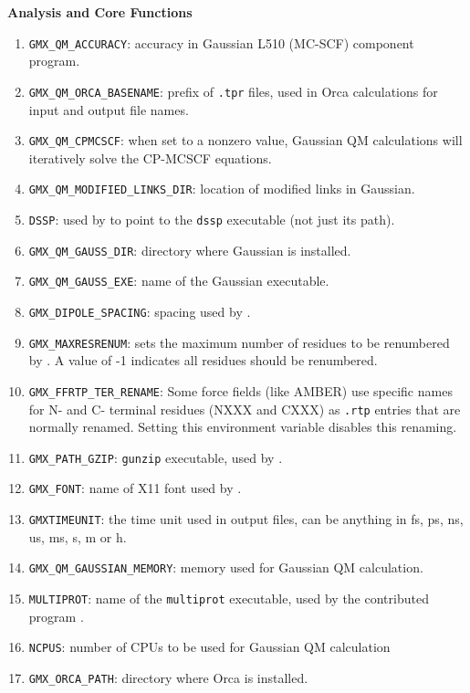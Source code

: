 {\bf Analysis and Core Functions}

\begin{enumerate}

\item   {\tt GMX_QM_ACCURACY}: accuracy in Gaussian L510 (MC-SCF) component program.
\item   {\tt GMX_QM_ORCA_BASENAME}: prefix of {\tt .tpr} files, used in Orca calculations
        for input and output file names.
\item   {\tt GMX_QM_CPMCSCF}: when set to a nonzero value, Gaussian QM calculations will
        iteratively solve the CP-MCSCF equations.
\item   {\tt GMX_QM_MODIFIED_LINKS_DIR}: location of modified links in Gaussian.
\item   {\tt DSSP}: used by {\tt {}} to point to the {\tt dssp}
        executable (not just its path).
\item   {\tt GMX_QM_GAUSS_DIR}: directory where Gaussian is installed.
\item   {\tt GMX_QM_GAUSS_EXE}: name of the Gaussian executable.
\item   {\tt GMX_DIPOLE_SPACING}: spacing used by {\tt {}}.
\item   {\tt GMX_MAXRESRENUM}: sets the maximum number of residues to be renumbered by
        {\tt {}}. A value of -1 indicates all residues should be renumbered.
\item   {\tt GMX_FFRTP_TER_RENAME}: Some force fields (like AMBER) use specific names for N- and C-
        terminal residues (NXXX and CXXX) as {\tt .rtp} entries that are normally renamed. Setting
        this environment variable disables this renaming.
\item   {\tt GMX_PATH_GZIP}: {\tt gunzip} executable, used by {\tt {}}.
\item   {\tt GMX_FONT}: name of X11 font used by {\tt {}}.
\item   {\tt GMXTIMEUNIT}: the time unit used in output files, can be
        anything in fs, ps, ns, us, ms, s, m or h.
\item   {\tt GMX_QM_GAUSSIAN_MEMORY}: memory used for Gaussian QM calculation.
\item   {\tt MULTIPROT}: name of the {\tt multiprot} executable, used by the
        contributed program {\tt {}}.
\item   {\tt NCPUS}: number of CPUs to be used for Gaussian QM calculation
\item   {\tt GMX_ORCA_PATH}: directory where Orca is installed.

\end{enumerate}
